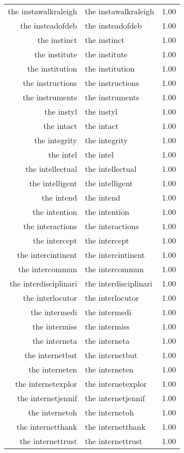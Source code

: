 \begin{table}[ht]
\begin{tabular}{rlr}
  the instawalkraleigh & the instawalkraleigh & 1.00 \\ 
  the insteadofdeb & the insteadofdeb & 1.00 \\ 
  the instinct & the instinct & 1.00 \\ 
  the institute & the institute & 1.00 \\ 
  the institution & the institution & 1.00 \\ 
  the instructions & the instructions & 1.00 \\ 
  the instruments & the instruments & 1.00 \\ 
  the instyl & the instyl & 1.00 \\ 
  the intact & the intact & 1.00 \\ 
  the integrity & the integrity & 1.00 \\ 
  the intel & the intel & 1.00 \\ 
  the intellectual & the intellectual & 1.00 \\ 
  the intelligent & the intelligent & 1.00 \\ 
  the intend & the intend & 1.00 \\ 
  the intention & the intention & 1.00 \\ 
  the interactions & the interactions & 1.00 \\ 
  the intercept & the intercept & 1.00 \\ 
  the intercintinent & the intercintinent & 1.00 \\ 
  the intercommun & the intercommun & 1.00 \\ 
  the interdisciplinari & the interdisciplinari & 1.00 \\ 
  the interlocutor & the interlocutor & 1.00 \\ 
  the intermedi & the intermedi & 1.00 \\ 
  the intermiss & the intermiss & 1.00 \\ 
  the interneta & the interneta & 1.00 \\ 
  the internetbut & the internetbut & 1.00 \\ 
  the interneten & the interneten & 1.00 \\ 
  the internetexplor & the internetexplor & 1.00 \\ 
  the internetjennif & the internetjennif & 1.00 \\ 
  the internetoh & the internetoh & 1.00 \\ 
  the internetthank & the internetthank & 1.00 \\ 
  the internettrust & the internettrust & 1.00 \\ 

\end{tabular}
\end{table}
